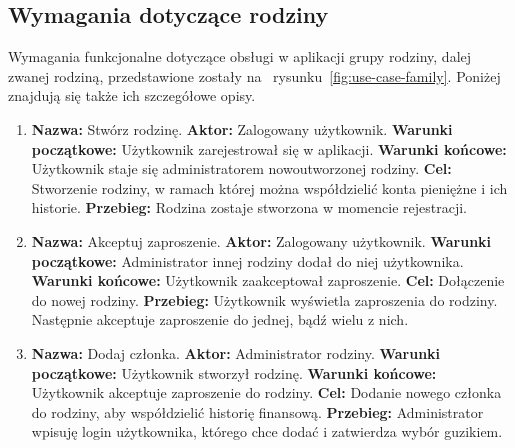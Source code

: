 \subsection{Wymagania dotyczące rodziny}
\label{subsec:wymagania-rodzina}
Wymagania funkcjonalne dotyczące obsługi w aplikacji grupy rodziny, dalej zwanej rodziną, przedstawione zostały na~ rysunku~\ref{fig:use-case-family}. Poniżej znajdują się także ich szczegółowe opisy.

\begin{enumerate}[labelwidth=1em,label=\arabic*.]
\item \textbf{Nazwa:} Stwórz rodzinę. \newline
    \textbf{Aktor:} Zalogowany użytkownik. \newline
    \textbf{Warunki początkowe:} Użytkownik zarejestrował się w aplikacji. \newline
    \textbf{Warunki końcowe:} Użytkownik staje się administratorem nowoutworzonej rodziny. \newline
    \textbf{Cel:} Stworzenie rodziny, w ramach której można współdzielić konta pieniężne i ich historie. \newline
    \textbf{Przebieg:} Rodzina zostaje stworzona w momencie rejestracji. 
\item \textbf{Nazwa:} Akceptuj zaproszenie. \newline
    \textbf{Aktor:} Zalogowany użytkownik. \newline
    \textbf{Warunki początkowe:} Administrator innej rodziny dodał do niej użytkownika. \newline
    \textbf{Warunki końcowe:} Użytkownik zaakceptował zaproszenie.  \newline
    \textbf{Cel:} Dołączenie do nowej rodziny. \newline
    \textbf{Przebieg:} Użytkownik wyświetla zaproszenia do rodziny. Następnie akceptuje zaproszenie do jednej, bądź wielu z nich.
\item \textbf{Nazwa:} Dodaj członka. \newline
    \textbf{Aktor:} Administrator rodziny. \newline
    \textbf{Warunki początkowe:} Użytkownik stworzył rodzinę. \newline
    \textbf{Warunki końcowe:} Użytkownik akceptuje zaproszenie do rodziny.  \newline
    \textbf{Cel:} Dodanie nowego członka do rodziny, aby współdzielić historię finansową. \newline
    \textbf{Przebieg:} Administrator wpisuję login użytkownika, którego chce dodać i zatwierdza wybór guzikiem. 

\end{enumerate}
